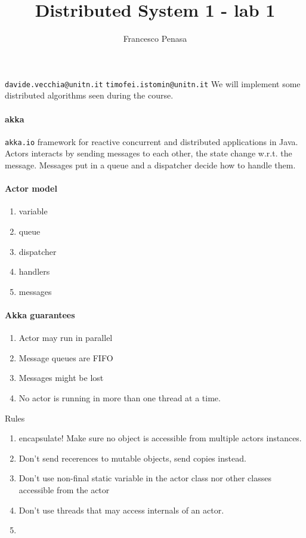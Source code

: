 \documentclass[11pt]{article}
\begin{document}
\author{Francesco Penasa}
\title{Distributed System 1 - lab 1}
\maketitle

\medskip

\texttt{davide.vecchia@unitn.it}
\texttt{timofei.istomin@unitn.it}
We will implement some distributed algorithms seen during the course.
\paragraph{akka} %
 \label{par:akka}
\texttt{akka.io}
framework for reactive concurrent and distributed applications in Java.
Actors interacts by sending messages to each other, the state change w.r.t. the message.
Messages put in a queue and a dispatcher decide how to handle them.

\paragraph{Actor model} %
\label{par:actor_model}
\begin{enumerate}
	\item variable
	\item queue
	\item dispatcher
	\item handlers
	\item messages
\end{enumerate}

\paragraph{Akka guarantees} %
\label{par:akka_guarantees}
\begin{enumerate}
	\item Actor may run in parallel
	\item Message queues are FIFO 
	\item Messages might be lost
	\item No actor is running in more than one thread at a time.
\end{enumerate}

Rules 
\begin{enumerate}
	\item encapsulate! Make sure no object is accessible from multiple actors instances.
	\item Don't send recerences to mutable objects, send copies instead.
	\item Don't use non-final static variable in the actor class nor other classes accessible from the actor
	\item Don't use threads that may access internals of an actor.
	\item 
\end{enumerate}
\end{document}
